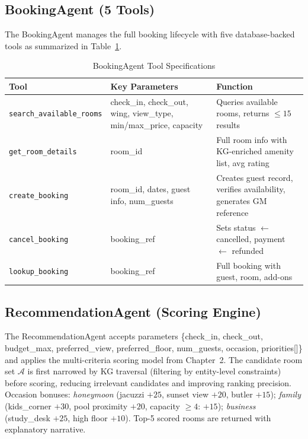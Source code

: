 \documentclass[11pt,a4paper]{report}
\begin{document}
\subsection{BookingAgent (5 Tools)}

The BookingAgent manages the full booking lifecycle with five database-backed tools as summarized in Table~\ref{tab:booking_tools}.

\begin{table}[H]
\centering
\caption{BookingAgent Tool Specifications}
\label{tab:booking_tools}
\renewcommand{\arraystretch}{1.3}
\begin{tabular}{p{4cm} p{5cm} p{4.5cm}}
\toprule
\textbf{Tool} & \textbf{Key Parameters} & \textbf{Function} \\
\midrule
\texttt{search\_available\_rooms} & check\_in, check\_out, wing, view\_type, min/max\_price, capacity & Queries available rooms, returns $\leq 15$ results \\
\texttt{get\_room\_details} & room\_id & Full room info with KG-enriched amenity list, avg rating \\
\texttt{create\_booking} & room\_id, dates, guest info, num\_guests & Creates guest record, verifies availability, generates GM reference \\
\texttt{cancel\_booking} & booking\_ref & Sets status $\leftarrow$ cancelled, payment $\leftarrow$ refunded \\
\texttt{lookup\_booking} & booking\_ref & Full booking with guest, room, add-ons \\
\bottomrule
\end{tabular}
\end{table}

\subsection{RecommendationAgent (Scoring Engine)}

The RecommendationAgent accepts parameters \{check\_in, check\_out, budget\_max, preferred\_view, preferred\_floor, num\_guests, occasion, priorities[]\} and applies the multi-criteria scoring model from Chapter~2. The candidate room set $\mathcal{A}$ is first narrowed by KG traversal (filtering by entity-level constraints) before scoring, reducing irrelevant candidates and improving ranking precision. Occasion bonuses: \emph{honeymoon} (jacuzzi $+25$, sunset view $+20$, butler $+15$); \emph{family} (kids\_corner $+30$, pool proximity $+20$, capacity $\geq 4$: $+15$); \emph{business} (study\_desk $+25$, high floor $+10$). Top-5 scored rooms are returned with explanatory narrative.
\end{document}
